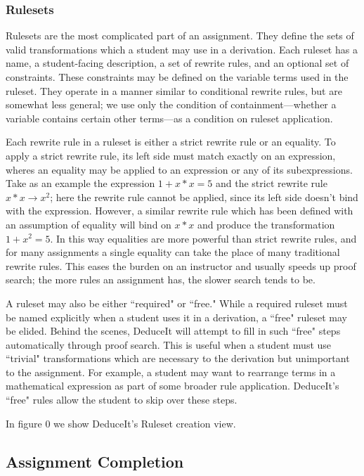 \documentclass{sigchi}
\begin{document}
\subsubsection{Rulesets}

Rulesets are the most complicated part of an assignment. They define the sets of valid transformations which a student may use in a derivation. Each ruleset has a name, a student-facing description, a set of rewrite rules, and an optional set of constraints. These constraints may be defined on the variable terms used in the ruleset. They operate in a manner similar to conditional rewrite rules, but are somewhat less general; we use only the condition of containment---whether a variable contains certain other terms---as a condition on ruleset application.

Each rewrite rule in a ruleset is either a strict rewrite rule or an equality. To apply a strict rewrite rule, its left side must match exactly on an expression, wheres an equality may be applied to an expression or any of its subexpressions. Take as an example the expression $1+x*x=5$ and the strict rewrite rule $x*x \rightarrow x^2$; here the rewrite rule cannot be applied, since its left side doesn't bind with the expression. However, a similar rewrite rule which has been defined with an assumption of equality will bind on $x*x$ and produce the transformation $1+x^2=5$. In this way equalities are more powerful than strict rewrite rules, and for many assignments a single equality can take the place of many traditional rewrite rules. This eases the burden on an instructor and usually speeds up proof search; the more rules an assignment has, the slower search tends to be.

A ruleset may also be either ``required" or ``free." While a required ruleset must be named explicitly when a student uses it in a derivation, a ``free" ruleset may be elided. Behind the scenes, DeduceIt will attempt to fill in such ``free" steps automatically through proof search. This is useful when a student must use ``trivial" transformations which are necessary to the derivation but unimportant to the assignment. For example, a student may want to rearrange terms in a mathematical expression as part of some broader rule application. DeduceIt's ``free" rules allow the student to skip over these steps.  

In figure 0 we show DeduceIt's Ruleset creation view.

\subsection{Assignment Completion}
\end{document}
